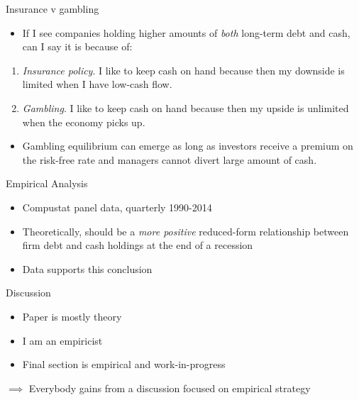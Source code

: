 \documentclass[ignorenonframetext,aspectratio=169]{beamer}
\providecommand{\tightlist}{%
  \setlength{\itemsep}{0pt}\setlength{\parskip}{0pt}}
\begin{document}
\begin{frame}{Insurance v gambling}

\begin{itemize}
\tightlist
\item
  If I see companies holding higher amounts of \emph{both} long-term
  debt and cash, can I say it is because of:
\end{itemize}

\begin{enumerate}
\def\labelenumi{\arabic{enumi}.}
\item
  \emph{Insurance policy}. I like to keep cash on hand because then my
  downside is limited when I have low-cash flow.
\item
  \emph{Gambling}. I like to keep cash on hand because then my upside is
  unlimited when the economy picks up.
\end{enumerate}

\begin{itemize}
\tightlist
\item
  Gambling equilibrium can emerge as long as investors receive a premium
  on the risk-free rate and managers cannot divert large amount of cash.
\end{itemize}

\end{frame}

\begin{frame}{Empirical Analysis}

\begin{itemize}
\item
  Compustat panel data, quarterly 1990-2014
\item
  Theoretically, should be a \emph{more positive} reduced-form
  relationship between firm debt and cash holdings at the end of a
  recession
\item
  Data supports this conclusion
\end{itemize}

\end{frame}

\begin{frame}{Discussion}

\begin{itemize}
\item
  Paper is mostly theory
\item
  I am an empiricist
\item
  Final section is empirical and work-in-progress
\end{itemize}

\(\implies\) Everybody gains from a discussion focused on empirical
strategy

\end{frame}
\end{document}
